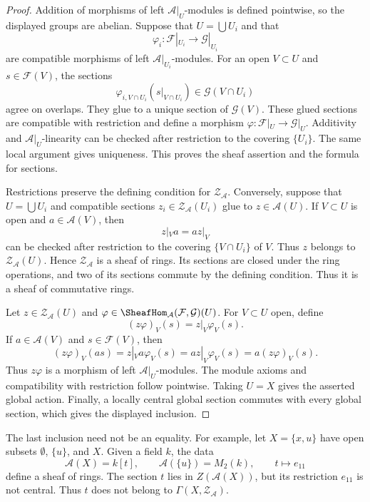 \begin{proof}
Addition of morphisms of left $\mathcal{A}|_U$-modules is defined
pointwise, so the displayed groups are abelian. Suppose that
$U = \bigcup U_i$ and that
$$
\varphi_i :
\mathcal{F}|_{U_i} \longrightarrow \mathcal{G}|_{U_i}
$$
are compatible morphisms of left
$\mathcal{A}|_{U_i}$-modules. For an open $V \subset U$ and
$s \in \mathcal{F}(V)$, the sections
$$
\varphi_{i, V \cap U_i}(s|_{V \cap U_i})
\in
\mathcal{G}(V \cap U_i)
$$
agree on overlaps. They glue to a unique section of
$\mathcal{G}(V)$. These glued sections are compatible with
restriction and define a morphism
$\varphi : \mathcal{F}|_U \to \mathcal{G}|_U$.
Additivity and $\mathcal{A}|_U$-linearity can be checked after
restriction to the covering $\{U_i\}$. The same local argument gives
uniqueness. This proves the sheaf assertion and the formula for
sections.

Restrictions preserve the defining condition for
$\mathcal{Z}_{\mathcal{A}}$. Conversely, suppose that
$U = \bigcup U_i$ and compatible sections
$z_i \in \mathcal{Z}_{\mathcal{A}}(U_i)$ glue to
$z \in \mathcal{A}(U)$. If $V \subset U$ is open and
$a \in \mathcal{A}(V)$, then
$$
z|_V a = a z|_V
$$
can be checked after restriction to the covering
$\{V \cap U_i\}$ of $V$. Thus $z$ belongs to
$\mathcal{Z}_{\mathcal{A}}(U)$. Hence
$\mathcal{Z}_{\mathcal{A}}$ is a sheaf of rings. Its sections are
closed under the ring operations, and two of its sections commute
by the defining condition. Thus it is a sheaf of commutative rings.

Let $z \in \mathcal{Z}_{\mathcal{A}}(U)$ and
$\varphi \in
\SheafHom_{\mathcal{A}}(\mathcal{F}, \mathcal{G})(U)$.
For $V \subset U$ open, define
$$
(z\varphi)_V(s) = z|_V\varphi_V(s).
$$
If $a \in \mathcal{A}(V)$ and $s \in \mathcal{F}(V)$, then
$$
(z\varphi)_V(as)
=
z|_V a\varphi_V(s)
=
a z|_V\varphi_V(s)
=
a(z\varphi)_V(s).
$$
Thus $z\varphi$ is a morphism of left
$\mathcal{A}|_U$-modules. The module axioms and compatibility with
restriction follow pointwise. Taking $U=X$ gives the asserted global
action. Finally, a locally central global section commutes with every
global section, which gives the displayed inclusion.
\end{proof}

\medskip\noindent
The last inclusion need not be an equality. For example, let
$X = \{x, u\}$ have open subsets
$\emptyset$, $\{u\}$, and $X$. Given a field $k$, the data
$$
\mathcal{A}(X) = k[t], \qquad
\mathcal{A}(\{u\}) = M_2(k), \qquad
t \longmapsto e_{11}
$$
define a sheaf of rings. The section $t$ lies in
$Z(\mathcal{A}(X))$, but its restriction $e_{11}$ is not central.
Thus $t$ does not belong to
$\Gamma(X, \mathcal{Z}_{\mathcal{A}})$.
